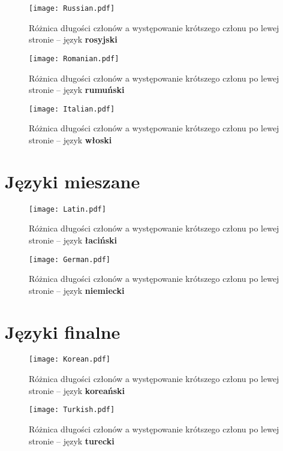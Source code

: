 \begin{sidewaysfigure}
\centering
\texttt{[image: Russian.pdf]}
\caption{Różnica długości członów a występowanie krótszego członu po lewej stronie -- język \textbf{rosyjski}}
\label{fig:ru}
\end{sidewaysfigure}

\begin{sidewaysfigure}
\centering
\texttt{[image: Romanian.pdf]}
\caption{Różnica długości członów a występowanie krótszego członu po lewej stronie -- język \textbf{rumuński}}
\label{fig:ro}
\end{sidewaysfigure}

\begin{sidewaysfigure}
\centering
\texttt{[image: Italian.pdf]}
\caption{Różnica długości członów a występowanie krótszego członu po lewej stronie -- język \textbf{włoski}}
\label{fig:it}
\end{sidewaysfigure}

\newpage

\section{Języki mieszane}

\begin{sidewaysfigure}
\centering
\texttt{[image: Latin.pdf]}
\caption{Różnica długości członów a występowanie krótszego członu po lewej stronie -- język \textbf{łaciński}}
\label{fig:la}
\end{sidewaysfigure}

\begin{sidewaysfigure}
\centering
\texttt{[image: German.pdf]}
\caption{Różnica długości członów a występowanie krótszego członu po lewej stronie -- język \textbf{niemiecki}}
\label{fig:de}
\end{sidewaysfigure}

\newpage

\section{Języki finalne}

\begin{sidewaysfigure}
\centering
\texttt{[image: Korean.pdf]}
\caption{Różnica długości członów a występowanie krótszego członu po lewej stronie -- język \textbf{koreański}}
\label{fig:ko}
\end{sidewaysfigure}

\begin{sidewaysfigure}
\centering
\texttt{[image: Turkish.pdf]}
\caption{Różnica długości członów a występowanie krótszego członu po lewej stronie -- język \textbf{turecki}}
\label{fig:tr}
\end{sidewaysfigure}